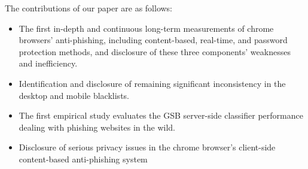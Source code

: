 The contributions of our paper are as follows:

\begin{itemize}
    \item The first in-depth and continuous long-term measurements of chrome browsers' anti-phishing, including content-based, real-time, and password protection methods, and disclosure of these three components' weaknesses and inefficiency.
    \item Identification and disclosure of remaining significant inconsistency in the desktop and mobile blacklists.
    \item The first empirical study evaluates the GSB server-side classifier performance dealing with phishing websites in the wild.
    \item Disclosure of serious privacy issues in the chrome browser's client-side content-based anti-phishing system
\end{itemize}
